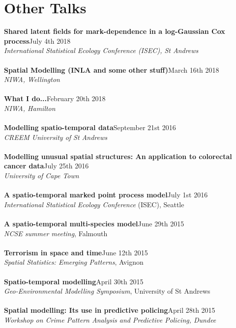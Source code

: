 \documentclass[10pt,letter]{article}
\begin{document}

\section*{Other Talks}
\vspace{1mm}
{\textbf{Shared latent fields for mark-dependence in a log-Gaussian Cox process}}\hfill July 4th 2018\\
 {\sl International Statistical Ecology Conference (ISEC), St Andrews}\\
\hdashrule[0.5ex]{4cm}{1pt}{1pt}\\
{\textbf{Spatial Modelling (INLA and some other stuff)}}\hfill March 16th 2018\\
 {\sl NIWA, Wellington}\\
\hdashrule[0.5ex]{4cm}{1pt}{1pt}\\
{\textbf{What I do...}}\hfill February 20th 2018\\
 {\sl NIWA, Hamilton}\\
\hdashrule[0.5ex]{4cm}{1pt}{1pt}\\
{\textbf{Modelling spatio-temporal data}}\hfill September 21st 2016\\
 {\sl CREEM University of St Andrews}\\
\hdashrule[0.5ex]{4cm}{1pt}{1pt}\\
{\textbf{Modelling unusual spatial structures: An application to colorectal cancer data}}\hfill July 25th 2016\\
 {\sl University of Cape Town}\\
\hdashrule[0.5ex]{4cm}{1pt}{1pt}\\
{\textbf{A spatio-temporal marked point process model}}\hfill July 1st 2016\\
 {\sl International Statistical Ecology Conference} (ISEC), Seattle\\
 \hdashrule[0.5ex]{4cm}{1pt}{1pt}\\
 {\textbf{A spatio-temporal multi-species model}}\hfill June 29th 2015\\
 {\sl NCSE summer meeting}, Falmouth\\
 \hdashrule[0.5ex]{4cm}{1pt}{1pt}\\
{\textbf{Terrorism in space and time}}\hfill June 12th 2015\\
 {\sl Spatial Statistics: Emerging Patterns}, Avignon\\
 \hdashrule[0.5ex]{4cm}{1pt}{1pt}\\
 {\textbf{Spatio-temporal modelling}}\hfill April 30th 2015\\
 {\sl Geo-Environmental Modelling Symposium}, University of St Andrews\\
 \hdashrule[0.5ex]{4cm}{1pt}{1pt}\\
{\textbf{Spatial modelling: Its use in predictive policing}}\hfill April 28th 2015\\
 {\sl Workshop on Crime Pattern Analysis and Predictive Policing, Dundee}\\
 \newpage
\end{document}
